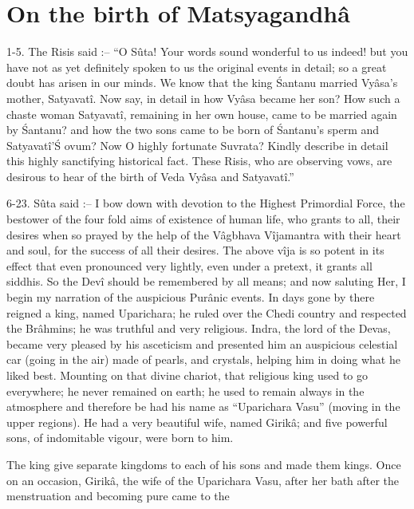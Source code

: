 ﻿\chapter{On the birth of Matsyagandh\^a}

1-5. The Risis said :-- ``O S\^uta! Your words sound wonderful to us indeed! but you have not as yet definitely spoken to us the original events in detail; so a great doubt has arisen in our minds. We know that the king \'Santanu married Vy\^asa's mother, Satyavat\^i. Now say, in detail in how Vy\^asa became her son? How such a chaste woman Satyavat\^i, remaining in her own house, came to be married again by \'Santanu? and how the two sons came to be born of \'Santanu's sperm and Satyavat\^i'\'S ovum? Now O highly fortunate Suvrata? Kindly describe in detail this highly sanctifying historical fact. These Risis, who are observing vows, are desirous to hear of the birth of Veda Vy\^asa and Satyavat\^i.''

6-23. S\^uta said :-- I bow down with devotion to the Highest Primordial Force, the bestower of the four fold aims of existence of human life, who grants to all, their desires when so prayed by the help of the V\^agbhava V\^ijamantra with their heart and soul, for the success of all their desires. The above v\^ija is so potent in its effect that even pronounced very lightly, even under a pretext, it grants all siddhis. So the Dev\^i should be remembered by all means; and now saluting Her, I begin my narration of the auspicious Pur\^anic events. In days gone by there reigned a king, named Uparichara; he ruled over the Chedi country and respected the Br\^ahmins; he was truthful and very religious. Indra, the lord of the Devas, became very pleased by his asceticism and presented him an auspicious celestial car (going in the air) made of pearls, and crystals, helping him in doing what he liked best. Mounting on that divine chariot, that religious king used to go everywhere; he never remained on earth; he used to remain always in the atmosphere and therefore be had his name as ``Uparichara Vasu'' (moving in the upper regions). He had a very beautiful wife, named Girik\^a; and five powerful sons, of indomitable vigour, were born to him.

The king give separate kingdoms to each of his sons and made them kings. Once on an occasion, Girik\^a, the wife of the Uparichara Vasu, after her bath after the menstruation and becoming pure came to the

